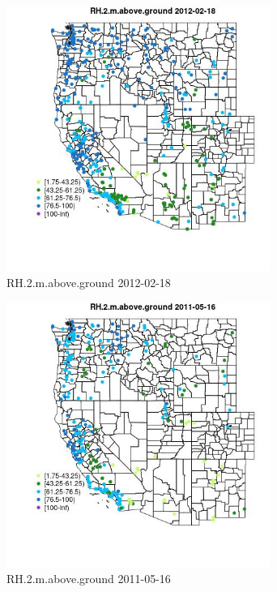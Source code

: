 \begin{figure} 
\centering  
\includegraphics[width=0.77\textwidth]{Code_Outputs/Report_ML_input_PM25_Step4_part_f_de_duplicated_aves_prioritize_24hr_obswNAs_MapObsRH2maboveground2012-02-18.jpg} 
\caption{\label{fig:Report_ML_input_PM25_Step4_part_f_de_duplicated_aves_prioritize_24hr_obswNAsMapObsRH2maboveground2012-02-18}RH.2.m.above.ground 2012-02-18} 
\end{figure} 
 

\begin{figure} 
\centering  
\includegraphics[width=0.77\textwidth]{Code_Outputs/Report_ML_input_PM25_Step4_part_f_de_duplicated_aves_prioritize_24hr_obswNAs_MapObsRH2maboveground2011-05-16.jpg} 
\caption{\label{fig:Report_ML_input_PM25_Step4_part_f_de_duplicated_aves_prioritize_24hr_obswNAsMapObsRH2maboveground2011-05-16}RH.2.m.above.ground 2011-05-16} 
\end{figure} 
 

